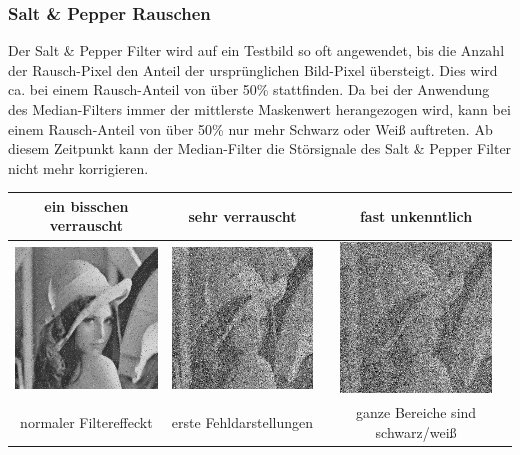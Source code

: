 \documentclass[12pt,german]{article}
\begin{document}
\subsubsection{Salt \& Pepper Rauschen}
Der Salt \& Pepper Filter wird auf ein Testbild so oft angewendet, bis die Anzahl der Rausch-Pixel den Anteil der ursprünglichen Bild-Pixel übersteigt. Dies wird ca. bei einem Rausch-Anteil von über 50\% stattfinden. Da bei der Anwendung des Median-Filters immer der mittlerste Maskenwert herangezogen wird, kann bei einem Rausch-Anteil von über 50\% nur mehr Schwarz oder Weiß auftreten. Ab diesem Zeitpunkt kann der Median-Filter die Störsignale des Salt \& Pepper Filter nicht mehr korrigieren.


\begin{table}[H]
  \centering
  \begin{tabular}{| c | c | c |}
	\hline	
	ein bisschen verrauscht & sehr verrauscht &  fast unkenntlich  \\
    \hline
	\includegraphics[width=4cm]{../testData/Median/LenaLittleNoise.jpg} & \includegraphics[width=4cm]{../testData/Median/LenaNoise.jpg} & \includegraphics[width=4cm]{../testData/Median/LenaNoisyNoise.jpg} \\ 
	\hline
	normaler Filtereffeckt & erste Fehldarstellungen & ganze Bereiche sind schwarz/weiß \\

\end{tabular}
\end{table}
\end{document}
